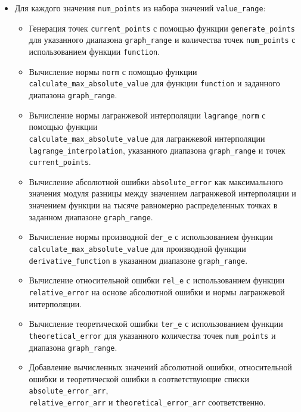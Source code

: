\documentclass{article}
\begin{document}
\begin{itemize}
\item Для каждого значения \texttt{num\_points} из набора значений \texttt{value\_range}:
\begin{itemize}
    \item Генерация точек \texttt{current\_points} с помощью функции \texttt{generate\_points} для указанного диапазона \texttt{graph\_range} и количества точек \texttt{num\_points} с использованием функции \texttt{function}.
    
    \item Вычисление нормы \texttt{norm} с помощью функции \texttt{calculate\_max\_absolute\_value} для функции \texttt{function} и заданного диапазона \texttt{graph\_range}.
    
    \item Вычисление нормы лагранжевой интерполяции \texttt{lagrange\_norm} с помощью функции \\ \texttt{calculate\_max\_absolute\_value} для лагранжевой интерполяции \texttt{lagrange\_interpolation}, указанного диапазона \texttt{graph\_range} и точек \texttt{current\_points}.
    
    \item Вычисление абсолютной ошибки \texttt{absolute\_error} как максимального значения модуля разницы между значением лагранжевой интерполяции и значением функции на тысяче равномерно распределенных точках в заданном диапазоне \texttt{graph\_range}.
    
    \item Вычисление нормы производной \texttt{der\_e} с использованием функции \texttt{calculate\_max\_absolute\_value} для производной функции \texttt{derivative\_function} в указанном диапазоне \texttt{graph\_range}.
    
    \item Вычисление относительной ошибки \texttt{rel\_e} с использованием функции \texttt{relative\_error} на основе абсолютной ошибки и нормы лагранжевой интерполяции.
    
    \item Вычисление теоретической ошибки \texttt{ter\_e} с использованием функции \texttt{theoretical\_error} для указанного количества точек \texttt{num\_points} и диапазона \texttt{graph\_range}.
    
    \item Добавление вычисленных значений абсолютной ошибки, относительной
    ошибки и теоретической ошибки в соответствующие списки \texttt{absolute\_error\_arr}, \\ \texttt{relative\_error\_arr} и \texttt{theoretical\_error\_arr} соответственно.
\end{itemize}


\end{itemize}
\end{document}
